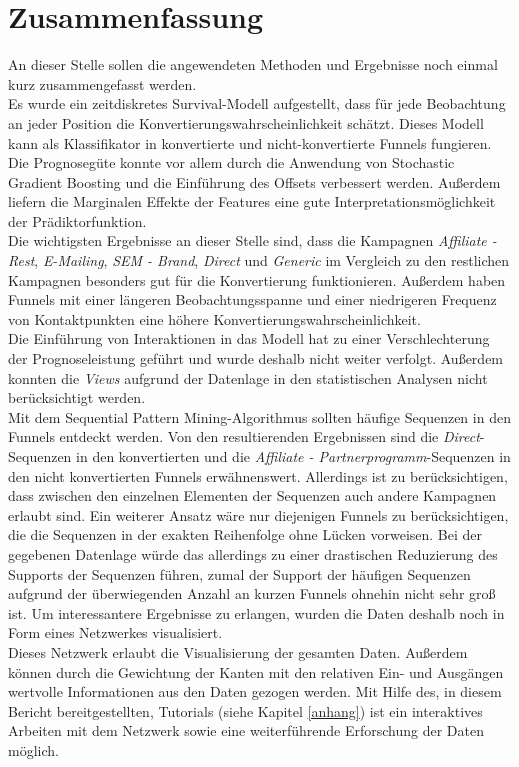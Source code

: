 \section{Zusammenfassung}\label{zusammenfassung}

An dieser Stelle sollen die angewendeten Methoden und Ergebnisse noch einmal kurz zusammengefasst werden.\\
Es wurde ein zeitdiskretes Survival-Modell aufgestellt, dass für jede Beobachtung an jeder Position die Konvertierungswahrscheinlichkeit schätzt. Dieses Modell kann als Klassifikator in konvertierte und nicht-konvertierte Funnels fungieren. Die Prognosegüte konnte vor allem durch die Anwendung von Stochastic Gradient Boosting und die Einführung des Offsets verbessert werden. Außerdem liefern die Marginalen Effekte der Features eine gute Interpretationsmöglichkeit der Prädiktorfunktion.\\
Die wichtigsten Ergebnisse an dieser Stelle sind, dass die Kampagnen \textit{Affiliate - Rest}, \textit{E-Mailing}, \textit{SEM - Brand}, \textit{Direct} und \textit{Generic} im Vergleich zu den restlichen Kampagnen besonders gut für die Konvertierung funktionieren. Außerdem haben Funnels mit einer längeren Beobachtungsspanne und einer niedrigeren Frequenz von Kontaktpunkten eine höhere Konvertierungswahrscheinlichkeit.\\
Die Einführung von Interaktionen in das Modell hat zu einer Verschlechterung der Prognoseleistung geführt und wurde deshalb nicht weiter verfolgt. Außerdem konnten die \textit{Views} aufgrund der Datenlage in den statistischen Analysen nicht berücksichtigt werden.\\
Mit dem Sequential Pattern Mining-Algorithmus sollten häufige Sequenzen in den Funnels entdeckt werden. Von den resultierenden Ergebnissen sind die \textit{Direct}-Sequenzen in den konvertierten und die \textit{Affiliate - Partnerprogramm}-Sequenzen in den nicht konvertierten Funnels erwähnenswert. Allerdings ist zu berücksichtigen, dass zwischen den einzelnen Elementen der Sequenzen auch andere Kampagnen erlaubt sind. Ein weiterer Ansatz wäre nur diejenigen Funnels zu berücksichtigen, die die Sequenzen in der exakten Reihenfolge ohne Lücken vorweisen. Bei der gegebenen Datenlage würde das allerdings zu einer drastischen Reduzierung des Supports der Sequenzen führen, zumal der Support der häufigen Sequenzen aufgrund der überwiegenden Anzahl an kurzen Funnels ohnehin nicht sehr groß ist. Um interessantere Ergebnisse zu erlangen, wurden die Daten deshalb noch in Form eines Netzwerkes visualisiert.\\
Dieses Netzwerk erlaubt die Visualisierung der gesamten Daten. Außerdem können durch die Gewichtung der Kanten mit den relativen Ein- und Ausgängen wertvolle Informationen aus den Daten gezogen werden. Mit Hilfe des, in diesem Bericht bereitgestellten, Tutorials (siehe Kapitel \ref{anhang}) ist ein interaktives Arbeiten mit dem Netzwerk sowie eine weiterführende Erforschung der Daten möglich.